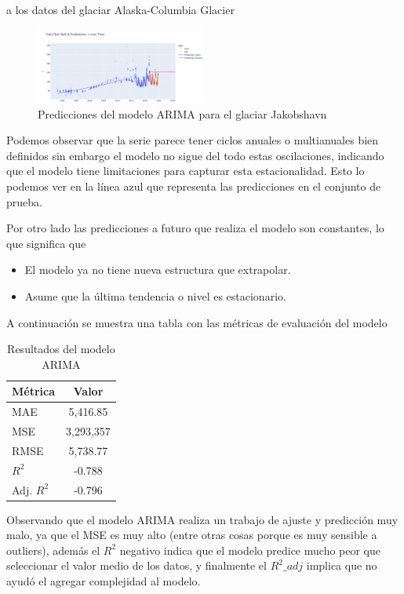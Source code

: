 \documentclass[sigconf,authordraft,language=spanish]{acmart}
\begin{document}
a los datos del glaciar Alaska-Columbia Glacier

\begin{figure}[H]
    \centering
    \includegraphics[width=0.5\textwidth]{ARIMA1.png} %
    \caption{Predicciones del modelo ARIMA para el glaciar Jakobshavn}
    \label{fig:ARIMA1}
\end{figure}

Podemos observar que la serie parece tener ciclos anuales o multianuales bien definidos sin embargo el modelo
no sigue del todo estas oscilaciones, indicando que el modelo tiene limitaciones para capturar esta estacionalidad. 
Esto lo podemos ver en la línea azul que representa las predicciones en el conjunto de prueba.

Por otro lado las predicciones a futuro que realiza el modelo son constantes, lo que significa que 

\begin{itemize}
  \item El modelo ya no tiene nueva estructura que extrapolar.
  \item Asume que la última tendencia o nivel es estacionario.
\end{itemize}

A continuación se muestra una tabla con las métricas de evaluación del modelo

\begin{table}[H]
  \caption{Resultados del modelo ARIMA}
  \label{tab:ARIMA}
  \begin{tabular}{lc}
    \toprule
    Métrica & Valor \\
    \midrule
    MAE & 5,416.85 \\
    MSE & 3,293,357 \\
    RMSE & 5,738.77 \\
    $R^2$ & -0.788 \\
    Adj. $R^2$ & -0.796 \\
    \bottomrule
  \end{tabular}
\end{table}

Observando que el modelo ARIMA realiza un trabajo de ajuste y predicción muy malo, ya que el
MSE es muy alto (entre otras cosas porque es muy sensible a outliers), además el $R^{2}$ negativo indica que 
el modelo predice mucho peor que seleccionar el valor medio de los datos, y finalmente el $R^{2}\_adj$ implica que
no ayudó el agregar complejidad al modelo.
\end{document}
